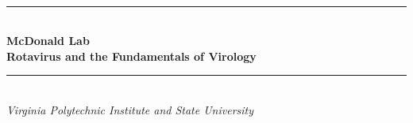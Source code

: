 \documentclass[11pt, final]{article}
\begin{document}
	
	\newcommand{\HRule}{\rule{\linewidth}{0.5mm}}


	\begin{titlepage}
		{~ \\[5cm] }
		
		\noindent \HRule \\[0.4cm]
		{ \Huge \bfseries McDonald Lab \\[0.4cm] }
		{ \huge \bfseries Rotavirus and the Fundamentals of Virology \\ }
		\HRule \\[0.4cm]
		
		{ \large \emph{Virginia Polytechnic Institute and State University} }
	\end{titlepage}


	\tableofcontents
	\clearpage
	

	

	\clearpage
	
	
\end{document}
